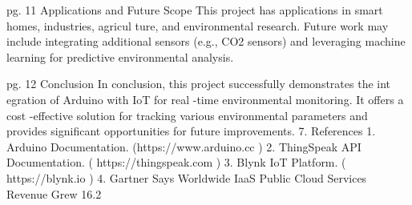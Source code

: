 \documentclass{article}
\begin{document}
 pg. 11 Applications and Future Scope   This project has applications in smart homes, industries, agricul ture, and environmental  research. Future work may include integrating additional sensors (e.g., CO2 sensors) and  leveraging machine learning for predictive environmental analysis.         

 pg. 12 Conclusion   In conclusion, this project successfully demonstrates the int egration of Arduino with IoT for  real -time environmental monitoring. It offers a cost -effective solution for tracking various  environmental parameters and provides significant opportunities for future improvements.   7. References   1. Arduino Documentation. (https://www.arduino.cc )  2. ThingSpeak API Documentation. ( https://thingspeak.com )  3. Blynk IoT Platform. ( https://blynk.io )  4. Gartner Says Worldwide IaaS Public Cloud Services Revenue Grew 16.2%
\end{document}
